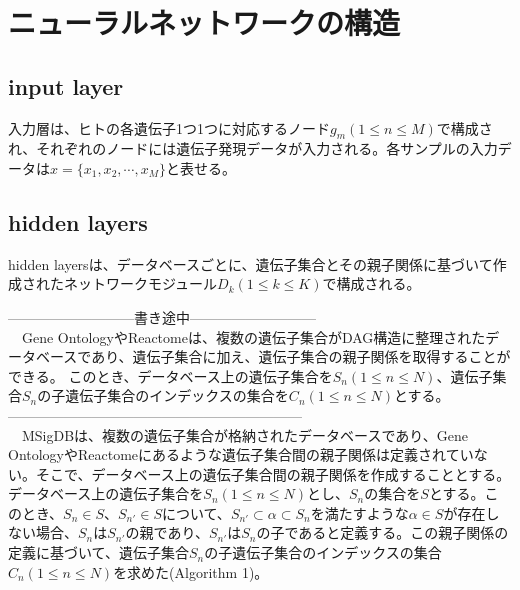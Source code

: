 \documentclass[a4paper,12pt]{jsreport}
\begin{document}
\section{ニューラルネットワークの構造}
\begin{comment}
\#\#\#\#\#\#\#\#\#\#\# \\
input layer、hidden layer、output layerについて全体と図\\
input layerについて\\
hidden layerについて(GO・ractomeとMSigDBのモジュール設計手法)\\
ノードの数の決め方、エッジの計算方法、tanhとbatchnorm\\
output layerについて\\
\#\#\#\#\#\#\#\#\#\#\# \\
\end{comment}


\subsection{input layer}
入力層は、ヒトの各遺伝子1つ1つに対応するノード$g_m(1\leq n\leq M)$で構成され、それぞれのノードには遺伝子発現データが入力される。各サンプルの入力データは$x = \{x_1, x_2, \cdots, x_M\}$と表せる。


\subsection{hidden layers}
hidden layersは、データベースごとに、遺伝子集合とその親子関係に基づいて作成されたネットワークモジュール$D_k(1\leq k\leq K)$で構成される。

\color{blue}---------------------------書き途中---------------------------\\
\color{black}
　Gene OntologyやReactomeは、複数の遺伝子集合がDAG構造に整理されたデータベースであり、遺伝子集合に加え、遺伝子集合の親子関係を取得することができる。
このとき、データベース上の遺伝子集合を$S_n(1\leq n\leq N)$、遺伝子集合$S_n$の子遺伝子集合のインデックスの集合を$C_n(1\leq n\leq N)$とする。\\
\color{blue}---------------------------------------------------------------\\
\color{black}
 　MSigDBは、複数の遺伝子集合が格納されたデータベースであり、Gene OntologyやReactomeにあるような遺伝子集合間の親子関係は定義されていない。そこで、データベース上の遺伝子集合間の親子関係を作成することとする。データベース上の遺伝子集合を$S_n(1\leq n\leq N)$とし、$S_n$の集合を$S$とする。このとき、$S_n \in S$、$S_{n'} \in S$について、$S_{n'} \subset \alpha \subset S_n$を満たすような$\alpha \in S$が存在しない場合、$S_n$は$S_{n'}$の親であり、$S_{n'}$は$S_n$の子であると定義する。この親子関係の定義に基づいて、遺伝子集合$S_n$の子遺伝子集合のインデックスの集合$C_n(1\leq n\leq N)$を求めた(Algorithm 1)。\\
 
\end{document}
